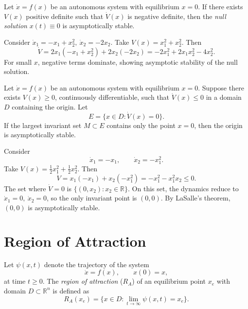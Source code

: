 
\begin{theorem}
Let $\dot{x}=f(x)$ be an autonomous system with equilibrium $x=0$.  
If there exists $V(x)$ positive definite such that $\dot V(x)$ is negative definite, then the \emph{null solution} $x(t)\equiv 0$ is asymptotically stable.
\end{theorem}

\begin{example}
Consider $\dot{x}_1=-x_1+x_2^2,\ \dot{x}_2=-2x_2$.  
Take $V(x)=x_1^2+x_2^2$. Then
\[
\dot V=2x_1(-x_1+x_2^2)+2x_2(-2x_2)=-2x_1^2+2x_1x_2^2-4x_2^2.
\]
For small $x$, negative terms dominate, showing asymptotic stability of the null solution.
\end{example}


\begin{theorem}
Let $\dot{x}=f(x)$ be an autonomous system with equilibrium $x=0$.  
Suppose there exists $V(x)\geq 0$, continuously differentiable, such that $\dot V(x)\leq 0$ in a domain $D$ containing the origin.  
Let 
\[
E=\{x\in D:\dot V(x)=0\}.
\]
If the largest invariant set $M\subset E$ contains only the point $x=0$, then the origin is asymptotically stable.
\end{theorem}

\begin{example}
Consider
\[
\dot{x}_1=-x_1,\qquad \dot{x}_2=-x_1^2.
\]
Take $V(x)=\tfrac12 x_1^2+\tfrac12 x_2^2$. Then
\[
\dot V= x_1(-x_1)+x_2(-x_1^2)=-x_1^2 -x_1^2x_2 \leq 0.
\]
The set where $\dot V=0$ is $\{(0,x_2):x_2\in\mathbb{R}\}$.  
On this set, the dynamics reduce to $\dot{x}_1=0,\ \dot{x}_2=0$, so the only invariant point is $(0,0)$.  
By LaSalle’s theorem, $(0,0)$ is asymptotically stable.
\end{example}

\section{Region of Attraction}

\begin{definition}
Let $\psi(x,t)$ denote the trajectory of the system
\[
\dot{x}=f(x), \qquad x(0)=x,
\]
at time $t\geq 0$.  
The \emph{region of attraction} ($R_A$) of an equilibrium point $x_e$ with domain $D\subset \mathbb{R}^n$ is defined as
\[
R_A(x_e)=\{x\in D:\lim_{t\to\infty}\psi(x,t)=x_e\}.
\]
\end{definition}

